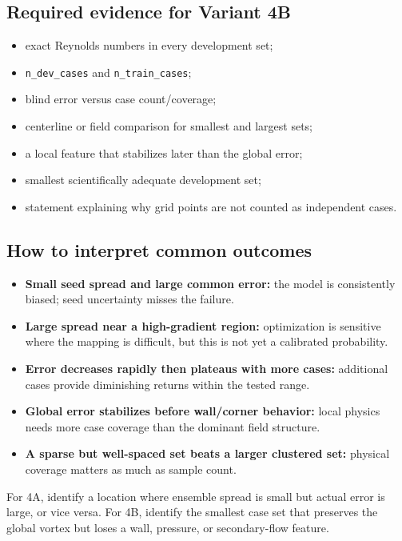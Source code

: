 \documentclass[11pt]{article}
\begin{document}
\subsection{Required evidence for Variant 4B}
\begin{itemize}
\item exact Reynolds numbers in every development set;
\item \texttt{n\_dev\_cases} and \texttt{n\_train\_cases};
\item blind error versus case count/coverage;
\item centerline or field comparison for smallest and largest sets;
\item a local feature that stabilizes later than the global error;
\item smallest scientifically adequate development set;
\item statement explaining why grid points are not counted as independent cases.
\end{itemize}

\subsection{How to interpret common outcomes}
\begin{itemize}
\item \textbf{Small seed spread and large common error:} the model is consistently biased; seed uncertainty misses the failure.
\item \textbf{Large spread near a high-gradient region:} optimization is sensitive where the mapping is difficult, but this is not yet a calibrated probability.
\item \textbf{Error decreases rapidly then plateaus with more cases:} additional cases provide diminishing returns within the tested range.
\item \textbf{Global error stabilizes before wall/corner behavior:} local physics needs more case coverage than the dominant field structure.
\item \textbf{A sparse but well-spaced set beats a larger clustered set:} physical coverage matters as much as sample count.
\end{itemize}

\begin{failurebox}
For 4A, identify a location where ensemble spread is small but actual error is large, or vice versa. For 4B, identify the smallest case set that preserves the global vortex but loses a wall, pressure, or secondary-flow feature.
\end{failurebox}
\end{document}
